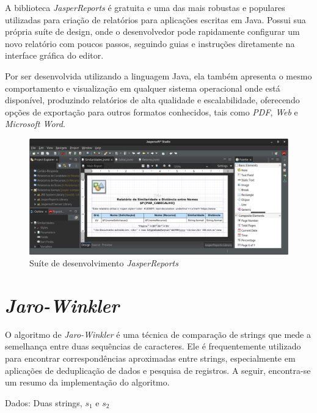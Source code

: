 \documentclass[
	12pt,			%
	openright,		%
	oneside,	
	a4paper,		%
	english,		%
	brazil			%
]{abntex2/abntex2}  %
\begin{document}
			A biblioteca \textit{JasperReports\textregistered} \cite{jasper} é gratuita e uma das mais robustas e populares utilizadas para criação de relatórios para aplicações escritas em Java. Possui sua própria suíte de design, onde o desenvolvedor pode rapidamente configurar um novo relatório com poucos passos, seguindo guias e instruções diretamente na interface gráfica do editor.
			
			Por ser desenvolvida utilizando a linguagem Java, ela também apresenta o mesmo comportamento e visualização em qualquer sistema operacional onde está disponível, produzindo relatórios de alta qualidade e escalabilidade, oferecendo opções de exportação para outros formatos conhecidos, tais como \textit{PDF}, \textit{Web} e \textit{Microsoft Word}.
			
			\begin{figure}[ht]
				\begin{center}
				
				\caption{Suíte de desenvolvimento \textit{JasperReports\textregistered}}
				\includegraphics[scale=0.35]{img/jaspersoft}
				
				\end{center}
			\end{figure}
			
		\section{\textit{Jaro-Winkler}} \label{jaro-winkler}
		
			O algoritmo de \textit{Jaro-Winkler} \cite{jaro-winkler} é uma técnica de comparação de strings que mede a semelhança entre duas sequências de caracteres. Ele é frequentemente utilizado para encontrar correspondências aproximadas entre strings, especialmente em aplicações de deduplicação de dados e pesquisa de registros. A seguir, encontra-se um resumo da implementação do algoritmo.
			
			Dados: Duas strings, $s_1$ e $s_2$
			
\end{document}
